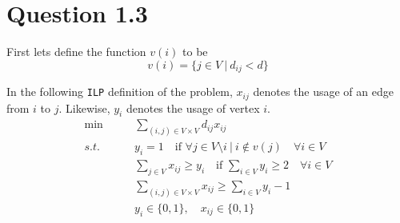 \documentclass[10pt]{article}
\begin{document}
\section*{Question 1.3} %
\label{sec:question_1_3}
First lets define the function $v(i)$ to be
\begin{equation}
   v(i) = \{ j \in V\ |\ d_{ij} < d \}
\end{equation}

% 
% 

In the following \texttt{ILP} definition of the problem, $x_{ij}$ denotes the usage of an edge from $i$ to $j$.
Likewise, $y_i$ denotes the usage of vertex $i$.
\begin{align}
\min &\qquad \sum_{(i,j) \in V \times V} d_{ij} x_{ij} \nonumber\\
s.t. &\qquad y_i = 1 \quad \text{if } \forall j \in V \setminus i\ |\ i \notin v(j) \quad \forall i \in V \nonumber\\
     &\qquad \sum_{j \in V} x_{ij} \geq y_i \quad \text{if } \sum_{i \in V} y_i \geq 2 \quad \forall i \in V \nonumber\\
     &\qquad \sum_{(i,j) \in V \times V} x_{ij} \geq \sum_{i \in V} y_i - 1 \nonumber\\
	 &\qquad y_i \in \{0,1\}, \quad x_{ij} \in \{0,1\} \nonumber
\end{align}


\end{document}
